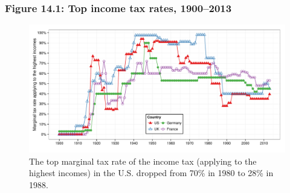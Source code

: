 \documentclass[t]{beamer}\usepackage[]{graphicx}\usepackage[]{color}
\newenvironment{knitrout}{}{} %
\begin{document}
\begin{frame}[label=Figure_14_1]
\frametitle{Figure 14.1: Top income tax rates, 1900--2013}
\begin{figure}[t]
\begin{minipage}[b]{\textwidth}
\centering
\begin{knitrout}\footnotesize
{}\color{fgcolor}

{\centering \includegraphics[width=1\linewidth]{figures/color/Figure_14_1} 

}



\end{knitrout}
\caption{The top marginal tax rate of the income tax (applying to the highest incomes) in the U.S. dropped from 70\% in 1980 to 28\% in 1988.}
\end{minipage}
\end{figure}
\end{frame}
\end{document}
